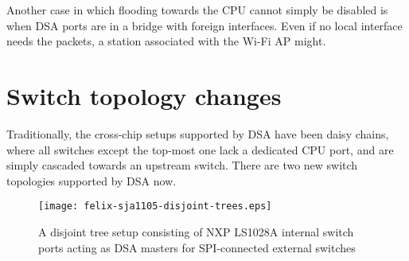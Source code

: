 \documentclass[letterpaper]{article}
\begin{document}
Another case in which flooding towards the CPU cannot simply be disabled is
when DSA ports are in a bridge with foreign interfaces. Even if no local
interface needs the packets, a station associated with the Wi-Fi AP might.

\section{Switch topology changes}

Traditionally, the cross-chip setups supported by DSA have been daisy chains,
where all switches except the top-most one lack a dedicated CPU port, and are
simply cascaded towards an upstream switch. There are two new switch topologies
supported by DSA now.

\begin{figure}[ht]
  \centering
  \texttt{[image: felix-sja1105-disjoint-trees.eps]}
  \caption{A disjoint tree setup consisting of NXP LS1028A internal switch ports acting as DSA masters for SPI-connected external switches}
  \label{felix-sja1105-disjoint-trees}
\end{figure}
\end{document}
